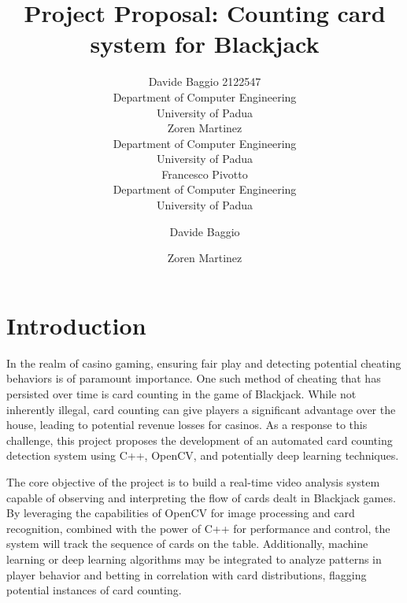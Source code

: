 \documentclass{article}
\title{Project Proposal: Counting card system for Blackjack}
\date{}
\author{{\hspace{1mm}Davide Baggio 2122547} \\
	Department of Computer Engineering\\
	University of Padua\\
	\And
	{\hspace{1mm}Zoren Martinez} \\
	Department of Computer Engineering\\
	University of Padua\\
	\And
	{\hspace{1mm}Francesco Pivotto} \\
	Department of Computer Engineering\\
	University of Padua\\
}
\author[1]{%
	{\usebox{\orcid}\hspace{1mm}Davide Baggio}
}
\author[1,2]{%
	{\usebox{\orcid}\hspace{1mm}Zoren Martinez}
}
\affil[1]{Department of Computer Engineering, University of Padua}
\affil[2]{Department of Computer Engineering, University of Padua}
\begin{document}
\maketitle





\section*{Introduction}

In the realm of casino gaming, ensuring fair play and detecting potential cheating behaviors is of paramount importance. One such method of cheating that has persisted over time is card counting in the game of Blackjack. While not inherently illegal, card counting can give players a significant advantage over the house, leading to potential revenue losses for casinos. As a response to this challenge, this project proposes the development of an automated card counting detection system using C++, OpenCV, and potentially deep learning techniques.

The core objective of the project is to build a real-time video analysis system capable of observing and interpreting the flow of cards dealt in Blackjack games. By leveraging the capabilities of OpenCV for image processing and card recognition, combined with the power of C++ for performance and control, the system will track the sequence of cards on the table. Additionally, machine learning or deep learning algorithms may be integrated to analyze patterns in player behavior and betting in correlation with card distributions, flagging potential instances of card counting.
\end{document}
